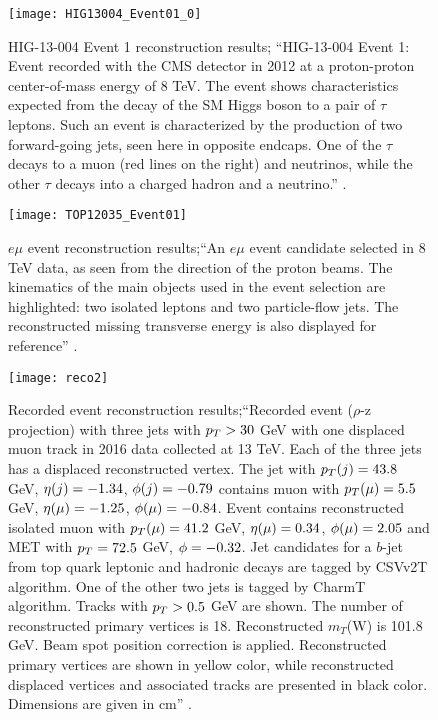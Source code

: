 \begin{figure}[!h]
  \centering
  \texttt{[image: HIG13004\_Event01\_0]}
  \caption[HIG-13-004 Event 1 reconstruction.]{HIG-13-004 Event 1 reconstruction results; ``HIG-13-004 Event 1: Event recorded with the CMS detector in 2012 at a proton-proton center-of-mass energy of 8 TeV. The event shows characteristics expected from the decay of the SM Higgs boson to a pair of $\tau$ leptons. Such an event is characterized by the production of two forward-going jets, seen here in opposite endcaps. One of the $\tau$ decays to a muon (red lines on the right) and neutrinos, while the other $\tau$ decays into a charged hadron and a neutrino.'' \cite{hig13}.}\label{fig:reco1}
\end{figure}
\begin{figure}[!h]
  \centering
  \texttt{[image: TOP12035\_Event01]}
  \caption[$e\mu$ event reconstruction.]{$e\mu$ event reconstruction results;``An $e\mu$ event candidate selected in 8 TeV data, as seen from the direction of the proton beams. The kinematics of the main objects used in the event selection are highlighted: two isolated leptons and two particle-flow jets. The reconstructed missing transverse energy is also displayed for reference'' \cite{top12035}.}\label{fig:reco2}
\end{figure}
\begin{figure}[!h]
  \centering
  \texttt{[image: reco2]}
  \caption[Recorded event reconstruction.]{Recorded event reconstruction results;``Recorded event ($\rho$-z projection) with three jets with $p_T>30$ GeV with one displaced muon track in 2016 data collected at 13 TeV. Each of the three jets has a displaced reconstructed vertex. The jet with $p_T(j)=43.8$ GeV, $\eta(j)=-1.34$, $\phi(j)=-0.79$ contains muon with $p_T(\mu)=5.5$ GeV, $\eta(\mu)=-1.25$, $\phi(\mu)=-0.84$. Event contains reconstructed isolated muon with $p_T(\mu)=41.2$ GeV, $\eta(\mu)=0.34$, $\phi(\mu)=2.05$ and MET with $p_T=72.5$ GeV, $\phi=-0.32$. Jet candidates for a $b$-jet from top quark leptonic and hadronic decays are tagged by CSVv2T algorithm. One of the other two jets is tagged by CharmT algorithm. Tracks with $p_T>0.5$ GeV are shown. The number of reconstructed primary vertices is 18. Reconstructed $m_T$(W) is 101.8 GeV. Beam spot position correction is applied. Reconstructed primary vertices are shown in yellow color, while reconstructed displaced vertices and associated tracks are presented in black color. Dimensions are given in cm'' \cite{reco1}.}\label{fig:reco3}
\end{figure}

